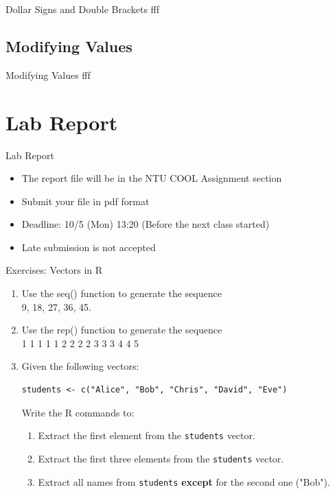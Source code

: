 \documentclass{beamer} %
\begin{document}
\begin{frame}[fragile]{Dollar Signs and Double Brackets}
  fff
\end{frame}
\subsection{Modifying Values}
\begin{frame}[fragile]{Modifying Values}
  fff
\end{frame}



\section{Lab Report}
\begin{frame}{Lab Report}
  \begin{itemize}
    \item The report file will be in the NTU COOL Assignment section
    \item Submit your file in pdf format
    \item Deadline: 10/5 (Mon) 13:20 (Before the next class started)
    \item Late submission is not accepted
  \end{itemize}
\end{frame}

\begin{frame}[fragile]{Exercises: Vectors in R}
  \begin{enumerate}
    \item Use the seq() function to generate the sequence \\  9, 18, 27, 36, 45.
    \item Use the rep() function to generate the sequence \\ 1 1 1 1 1 2 2 2 2 3 3 3 4 4 5
    \item Given the following vectors:
    \begin{lstlisting}
students <- c("Alice", "Bob", "Chris", "David", "Eve")
    \end{lstlisting}
    Write the R commands to:
    \begin{enumerate}
      \item Extract the first element from the \texttt{students} vector.
      \item Extract the first three elements from the \texttt{students} vector.
      \item Extract all names from \texttt{students} \textbf{except} for the second one ("Bob").
    \end{enumerate}
  \end{enumerate}
\end{frame}
\end{document}
